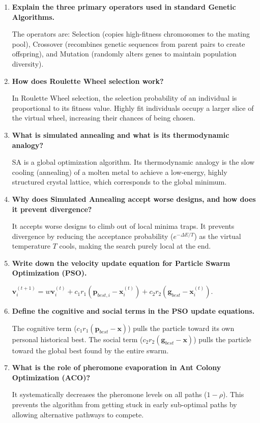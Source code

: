 \documentclass[12pt,a4paper]{article}
\newcommand{\Q}[1]{\textbf{#1}\par\noindent\ignorespaces}
\begin{document}
\begin{tcolorbox}[exambox, title={\textbf{Frequently Asked / Viva Questions}}]
\begin{enumerate}[topsep=0pt, label=\textbf{Q\arabic*.}, itemsep=5pt]
  \item \Q{Explain the three primary operators used in standard Genetic Algorithms.}
    The operators are: Selection (copies high-fitness chromosomes to the mating pool), Crossover (recombines genetic sequences from parent pairs to create offspring), and Mutation (randomly alters genes to maintain population diversity).
  \item \Q{How does Roulette Wheel selection work?}
    In Roulette Wheel selection, the selection probability of an individual is proportional to its fitness value. Highly fit individuals occupy a larger slice of the virtual wheel, increasing their chances of being chosen.
  \item \Q{What is simulated annealing and what is its thermodynamic analogy?}
    SA is a global optimization algorithm. Its thermodynamic analogy is the slow cooling (annealing) of a molten metal to achieve a low-energy, highly structured crystal lattice, which corresponds to the global minimum.
  \item \Q{Why does Simulated Annealing accept worse designs, and how does it prevent divergence?}
    It accepts worse designs to climb out of local minima traps. It prevents divergence by reducing the acceptance probability ($e^{-\Delta E/T}$) as the virtual temperature $T$ cools, making the search purely local at the end.
  \item \Q{Write down the velocity update equation for Particle Swarm Optimization (PSO).}
    $\mathbf{v}_i^{(t+1)} = w \mathbf{v}_i^{(t)} + c_1 r_1 \left( \mathbf{p}_{best, i} - \mathbf{x}_i^{(t)} \right) + c_2 r_2 \left( \mathbf{g}_{best} - \mathbf{x}_i^{(t)} \right)$.
  \item \Q{Define the cognitive and social terms in the PSO update equations.}
    The cognitive term ($c_1 r_1(\mathbf{p}_{best} - \mathbf{x})$) pulls the particle toward its own personal historical best. The social term ($c_2 r_2(\mathbf{g}_{best} - \mathbf{x})$) pulls the particle toward the global best found by the entire swarm.
  \item \Q{What is the role of pheromone evaporation in Ant Colony Optimization (ACO)?}
    It systematically decreases the pheromone levels on all paths ($1-\rho$). This prevents the algorithm from getting stuck in early sub-optimal paths by allowing alternative pathways to compete.

\end{enumerate}
\end{tcolorbox}
\end{document}
